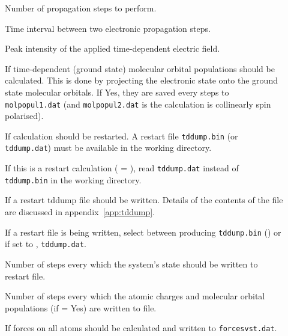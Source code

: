 \begin{description}
\item[] Number of propagation steps to perform.

\item[] Time interval between two
  electronic propagation steps.

\item[]
  Peak intensity of the applied time-dependent electric field.

\item[] If time-dependent (ground state) molecular
  orbital populations should be calculated. This is done by projecting
  the electronic state onto the ground state molecular orbitals. If
  Yes, they are saved every  steps to
  \verb|molpopul1.dat| (and \verb|molpopul2.dat| is the calculation is
  collinearly spin polarised).

\item[] If calculation should be restarted. A restart file
  \verb|tddump.bin| (or \verb|tddump.dat|) must be available in the working
  directory.

\item[] If this is a restart calculation ( =
  ), read \verb|tddump.dat| instead of \verb|tddump.bin| in the working
  directory.

\item[] If a restart tddump file should be written. Details of
  the contents of the file are discussed in appendix~\ref{app:tddump}.

\item[] If a restart file is being written, select between
  producing \verb|tddump.bin| () or if set to ,
  \verb|tddump.dat|.

\item[] Number of steps every which the system's
  state should be written to restart file.

\item[] Number of steps every which the atomic
  charges and molecular orbital populations (if  =
  Yes) are written to file.

\item[] If forces on all atoms should be calculated and
  written to \verb|forcesvst.dat|.


\end{description}
